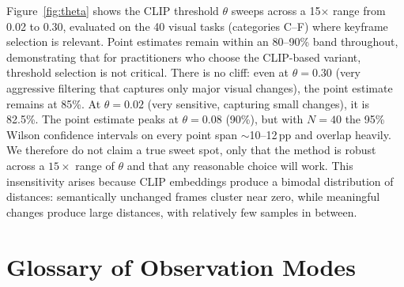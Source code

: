 \documentclass[11pt]{article}
\begin{document}
Figure~\ref{fig:theta} shows the CLIP threshold $\theta$ sweeps across a 15$\times$ range from 0.02 to 0.30, evaluated on the 40 visual tasks (categories C--F) where keyframe selection is relevant.
Point estimates remain within an 80--90\% band throughout, demonstrating that for practitioners who choose the CLIP-based variant, threshold selection is not critical.
There is no cliff: even at $\theta = 0.30$ (very aggressive filtering that captures only major visual changes), the point estimate remains at 85\%.
At $\theta = 0.02$ (very sensitive, capturing small changes), it is 82.5\%.
The point estimate peaks at $\theta = 0.08$ (90\%), but with $N{=}40$ the 95\% Wilson confidence intervals on every point span $\sim$10--12\,pp and overlap heavily. We therefore do not claim a true sweet spot, only that the method is robust across a $15\times$ range of $\theta$ and that any reasonable choice will work.
This insensitivity arises because CLIP embeddings produce a bimodal distribution of distances: semantically unchanged frames cluster near zero, while meaningful changes produce large distances, with relatively few samples in between.

\section{Glossary of Observation Modes}
\label{app:modes}
\end{document}
